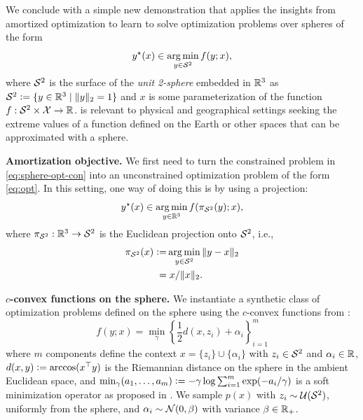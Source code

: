 \documentclass[twoside,11pt]{article}
\newcommand{\ie}{i.e.\xspace}
\begin{document}
We conclude with a simple new demonstration that applies
the insights from amortized optimization to learn to solve
optimization problems over spheres of the form
\begin{equation}
  y^\star(x) \in \operatorname*{arg\,min}_{y\in{\mathcal{S}}^2} f(y; x),
  \label{eq:sphere-opt-con}
\end{equation}
where ${\mathcal{S}}^2$ is the surface of the \emph{unit 2-sphere}
embedded in $\mathbb{R}^3$ as ${\mathcal{S}}^2\vcentcolon= \{y\in\mathbb{R}^3 \mid \|y\|_2=1\}$
and $x$ is some parameterization of the function
$f: {\mathcal{S}}^2\times{\mathcal{X}}\rightarrow \mathbb{R}$.
 is relevant to physical and
geographical settings seeking the extreme values of a
function defined on the Earth or other spaces that can
be approximated with a sphere.

\textbf{Amortization objective.}
We first need to turn the constrained problem in \cref{eq:sphere-opt-con}
into an unconstrained optimization problem of the form
\cref{eq:opt}. In this setting, one way of doing this
is by using a projection:
\begin{equation}
  y^\star(x) \in \operatorname*{arg\,min}_{y\in\mathbb{R}^3} f(\pi_{{\mathcal{S}}^2}(y); x),
  \label{eq:sphere-opt-proj}
\end{equation}
where $\pi_{{\mathcal{S}}^2}: \mathbb{R}^3\rightarrow {\mathcal{S}}^2$ is the
Euclidean projection onto ${\mathcal{S}}^2$, \ie,
\begin{equation}
  \begin{aligned}
    \pi_{{\mathcal{S}}^2}(x)\vcentcolon=& \operatorname*{arg\,min}_{y\in{\mathcal{S}}^2} \|y-x\|_2 \\
     =& \;x/\|x\|_2.
  \end{aligned}
  \label{eq:pi}
\end{equation}

\textbf{$c$-convex functions on the sphere.}
We instantiate a synthetic class of
optimization problems defined on the sphere
using the $c$-convex functions from
\citet{cohen2021riemannian}:
\begin{equation}
  f(y; x) = {\textstyle \min_{\gamma}} \left\{\frac{1}{2} d(x,z_i)+\alpha_i\right\}_{i=1}^m
  \label{eq:rcpm}
\end{equation}
where $m$ components define the context
$x=\{z_i\} \cup \{\alpha_i\}$
with $z_i\in{\mathcal{S}}^2$ and $\alpha_i\in\mathbb{R}$,
$d(x,y)\vcentcolon= \arccos(x^\top y)$ is the
Riemannian distance on the sphere in the
ambient Euclidean space, and
$\min_\gamma(a_1,\ldots,a_m)\vcentcolon= -\gamma\log\sum_{i=1}^m\exp(-a_i/\gamma)$
is a soft minimization operator
as proposed in \citet{cuturi2017soft}.
We sample $p(x)$ with $z_i\sim {\mathcal{U}}({\mathcal{S}}^2)$,
uniformly from the sphere, and
$\alpha_i\sim{\mathcal{N}}(0,\beta)$
with variance $\beta\in\mathbb{R}_+$.
\end{document}
